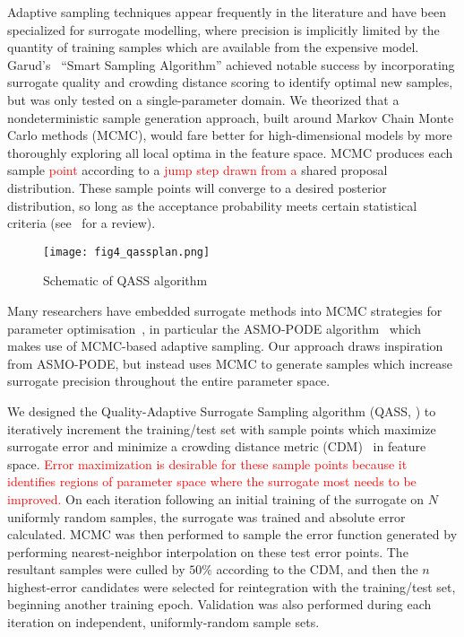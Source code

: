Adaptive sampling techniques appear frequently in the literature and have been
specialized for surrogate modelling, where precision is implicitly limited by the quantity of training samples which are available from the expensive model. Garud's~\cite{Garud2016} ``Smart Sampling Algorithm'' achieved notable success by incorporating surrogate quality and
crowding distance scoring to identify optimal new samples, but was only tested
on a single-parameter domain. We theorized that a nondeterministic sample
generation approach, built around Markov Chain Monte Carlo methods (MCMC), would
fare better for high-dimensional models by more thoroughly exploring all local
optima in the feature space. MCMC produces each sample \textcolor{red}{point} according to a \textcolor{red}{jump step drawn from a} shared proposal
distribution. These sample points will converge to a desired posterior
distribution, so long as the acceptance probability meets certain statistical criteria (see~\cite{Zhou2018} for a review).

\begin{figure}
	\centering
	\hspace*{-5pt}\texttt{[image: fig4\_qassplan.png]}
	\caption{\label{fig:qassplan}Schematic of QASS algorithm}
\end{figure}

Many researchers have embedded surrogate methods into MCMC strategies for
parameter optimisation~\cite{Zhang2020,Gong2017}, in particular the ASMO-PODE
algorithm~\cite{Ginting2011} which makes use of MCMC-based adaptive sampling. Our approach draws inspiration from ASMO-PODE, but instead uses MCMC to generate samples
which increase surrogate precision throughout the entire parameter space.

We designed the Quality-Adaptive Surrogate Sampling algorithm (QASS, ) to iteratively increment the training/test set with sample
points which maximize surrogate error and minimize a crowding distance metric
(CDM)~\cite{Solonen2012} in feature space. \textcolor{red}{Error maximization is desirable for these sample points because it identifies regions of parameter space where the surrogate most needs to be improved.} On each iteration following an initial training of the surrogate on $N$ uniformly random samples, the surrogate was trained and absolute error calculated. MCMC was then performed to sample the error function generated by performing nearest-neighbor interpolation on these test error points. The resultant samples were culled by $50\%$ according to the CDM, and then the $n$ highest-error candidates were selected for reintegration with the training/test set, beginning another training epoch. Validation was also performed during each iteration on independent, uniformly-random sample sets.
